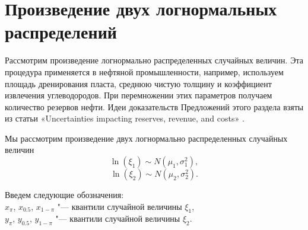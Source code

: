 \documentclass[12pt]{article}
\begin{document}
	\section{Произведение двух логнормальных распределений}
	Рассмотрим произведение логнормально распределенных случайных величин. Эта процедура применяется в нефтяной промышленности, например, используем площадь дренирования пласта, среднюю чистую толщину и коэффициент извлечения углеводородов. При перемножении этих параметров получаем количество резервов нефти. Идеи доказательств Предложений этого раздела взяты из статьи «Uncertainties impacting reserves, revenue, and costs» \cite{Uncertainties}.
	
	Мы рассмотрим произведение двух логнормально распределенных случайных величин 
	\begin{equation*}
		\ln(\xi_{1}) \sim N(\mu_{1}, \sigma _{1}^{2}),
	\end{equation*}
	\begin{equation*}
		\ln(\xi_{2}) \sim N(\mu_{2}, \sigma _{2}^{2}).
	\end{equation*}
	
	Введем следующие обозначения:\\
	$x_{\pi}$, $x_{0.5}$, $x_{1-\pi}$ "--- квантили случайной величины $\xi_{1}$,\\
	$y_{\pi}$, $y_{0.5}$, $y_{1-\pi}$ "--- квантили случайной величины $\xi_{2}$.
	
\end{document}
